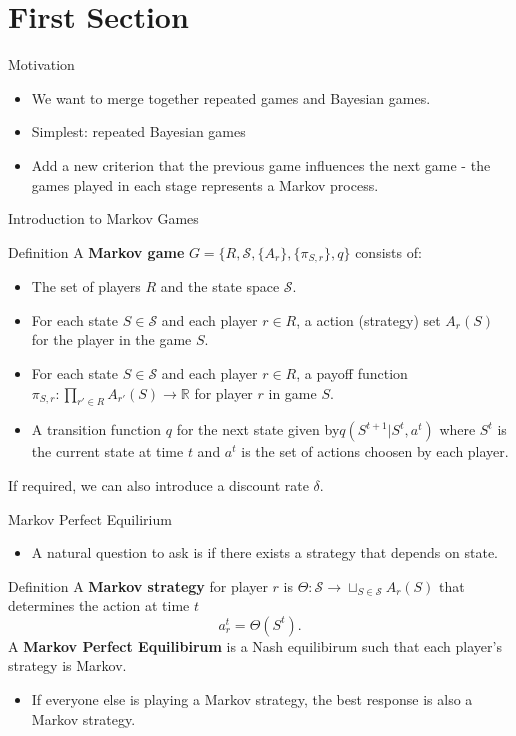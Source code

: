 \documentclass[aspectratio=169,xcolor=dvipsnames]{beamer}
\newcommand{\reals}{\mathbb{R}}
\begin{document}
\section{First Section}
\begin{frame}{Motivation}
    \begin{itemize}
        \item We want to merge together repeated games and Bayesian games. 
        \item Simplest: repeated Bayesian games
        \item Add a new criterion that the previous game influences the next game - the games played in each stage represents a Markov process.
    \end{itemize}
    
\end{frame}
\begin{frame}{Introduction to Markov Games}
    \begin{block}{Definition}
        A \textbf{Markov game} $G=\{R,\mathcal{S},\{A_r\},\{\pi_{S,r}\},q\}$ consists of:\begin{itemize}
            \item The set of players $R$ and the state space $\mathcal{S}$.
            \item For each state $S\in \mathcal{S}$ and each player $r\in R$, a action (strategy) set $A_r(S)$ for the player in the game $S$.
            \item For each state $S\in \mathcal{S}$ and each player $r\in R$, a payoff function $\pi_{S,r}: \prod_{r'\in R} A_{r'}(S) \to \reals$ for player $r$ in game $S$.
            \item A transition function $q$ for the next state given by$
            q(S^{t+1}|S^t,a^t)
            $
            where $S^t$ is the current state at time $t$ and $a^t$ is the set of actions choosen by each player.
        \end{itemize}
        If required, we can also introduce a discount rate $\delta$.
    \end{block}
\end{frame}
\begin{frame}{Markov Perfect Equilirium}
    \begin{itemize}
        \item A natural question to ask is if there exists a strategy that depends on state.
    \end{itemize}
    \begin{block}{Definition}
    A \textbf{Markov strategy} for player $r$ is $\Theta:\mathcal{S} \to \sqcup_{S\in \mathcal{S}}A_r(S) $ that determines the action at time $t$ \[
        a_r^t = \Theta(S^t).
    \]
    A \textbf{Markov Perfect Equilibirum} is a Nash equilibirum such that each player's strategy is Markov.
    \end{block}
    \begin{itemize}
        \item If everyone else is playing a Markov strategy, the best response is also a Markov strategy.
    \end{itemize}
\end{frame}
\end{document}
